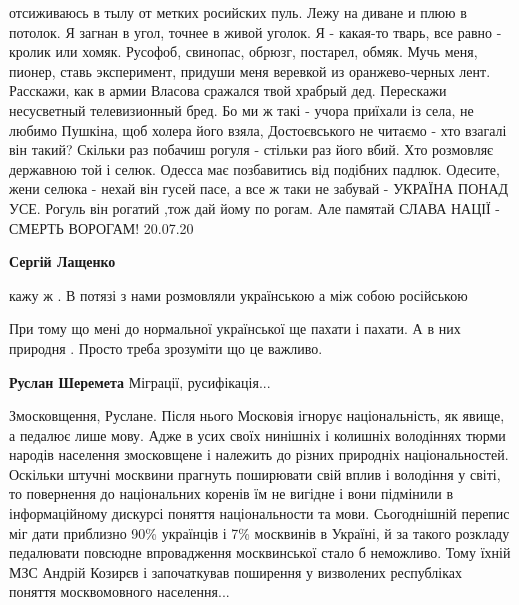 \begin{itemize}
\begin{itemize}
\obeycr
отсиживаюсь в тылу от метких росийских пуль.
Лежу на диване и плюю в потолок.
Я загнан в угол, точнее в живой уголок.
Я - какая-то тварь, все равно - кролик или хомяк.
Русофоб, свинопас, обрюзг, постарел, обмяк.
Мучь меня, пионер, ставь эксперимент,
придуши меня веревкой из оранжево-черных лент.
Расскажи, как в армии Власова сражался твой храбрый дед.
Перескажи несусветный телевизионный бред.
Бо ми ж такі - учора приїхали із села,
не любимо Пушкіна, щоб холера його взяла,
Достоєвського не читаємо - хто взагалі він такий?
Скільки раз побачиш рогуля - стільки раз його вбий.
Хто розмовляє державною той і селюк.
Одесса має позбавитись від подібних падлюк.
Одесите, жени селюка - нехай він гусей пасе,
а все ж таки не забувай - УКРАЇНА ПОНАД УСЕ.
Рогуль він рогатий ,тож дай йому по рогам.
Але памятай СЛАВА НАЦІЇ - СМЕРТЬ ВОРОГАМ!
20.07.20
\restorecr

 
\textbf{Сергій Лащенко} 

кажу ж . В потязі з нами розмовляли українською а між собою російською

При тому що мені до нормальної української ще пахати і пахати. А в них природня . Просто треба зрозуміти що це важливо.

 
\textbf{Руслан Шеремета} Міграції, русифікація...

 

Змосковщення, Руслане. Після нього Московія ігнорує національність, як явище, а
педалює лише мову. Адже в усих своїх нинішніх і колишніх володіннях тюрми
народів населення змосковщене і належить до різних природніх національностей.
Оскільки штучні москвини прагнуть поширювати свій вплив і володіння у світі, то
повернення до національних коренів їм не вигідне і вони підмінили в
інформаційному дискурсі поняття національности та мови. Сьогоднішній перепис
міг дати приблизно 90\% українців і 7\% москвинів в Україні, й за такого
розкладу педалювати повсюдне впровадження москвинської стало б неможливо. Тому
їхній МЗС Андрій Козирєв і започаткував поширення у визволених республіках
поняття москвомовного населення...


\end{itemize}
\end{itemize}
